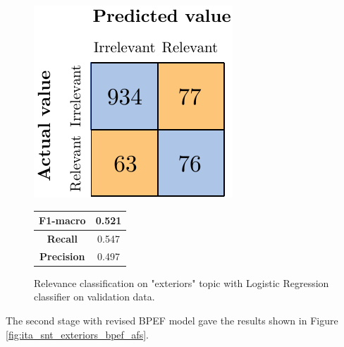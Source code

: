 \begin{figure}[H]
	\begin{minipage}[b]{0.6\linewidth}
		\centering
		\includegraphics[scale=1]{figures/conf_matrices/ita_exteriors/ita_rel_exteriors_logreg_afs.pdf}
	\end{minipage}
	\begin{minipage}[b]{0.3\linewidth}
		\begin{tabular}[b]{ | c | c | } 
			\hline
			\textbf{F1-macro} & 0.521 \\
			\hline
			\textbf{Recall} & 0.547 \\ 
			\hline
			\textbf{Precision} & 0.497 \\ 
			\hline
		\end{tabular}
	\end{minipage}
	\caption{Relevance classification on "exteriors" topic with Logistic Regression classifier on validation data.}
	\label{fig:ita_rel_exteriors_logreg_afs}
\end{figure}


The second stage with revised BPEF model gave the results shown in Figure \ref{fig:ita_snt_exteriors_bpef_afs}.

